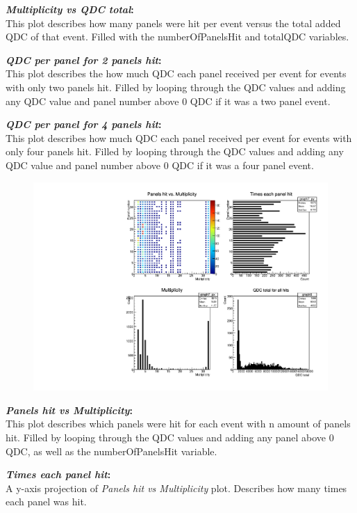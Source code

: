 \documentclass[a4paper,12pt]{article}
\begin{document}
\textbf{\emph{Multiplicity vs QDC total}:} \\
This plot describes how many panels were hit per event versus the total added QDC of that event. Filled with the numberOfPanelsHit and totalQDC variables.

\textbf{\emph{QDC per panel for 2 panels hit}:} \\
This plot describes the how much QDC each panel received per event for events with only two panels hit. Filled by looping through the QDC values and adding any QDC value and panel number above 0 QDC if it was a two panel event.

\textbf{\emph{QDC per panel for 4 panels hit}:} \\
This plot describes how much QDC each panel received per event for events with only four panels hit. Filled by looping through the QDC values and adding any QDC value and panel number above 0 QDC if it was a four panel event.

\pagebreak
\begin{figure}[h]
\centering
\includegraphics[scale=0.8]{Projections.pdf}
\end{figure}

\textbf{\emph{Panels hit vs Multiplicity}:} \\
This plot describes which panels were hit for each event with n amount of panels hit. Filled by looping through the QDC values and adding any panel above 0 QDC, as well as the numberOfPanelsHit variable.

\textbf{\emph{Times each panel hit}:} \\
A y-axis projection of \emph{Panels hit vs Multiplicity} plot. Describes how many times each panel was hit.
\end{document}
